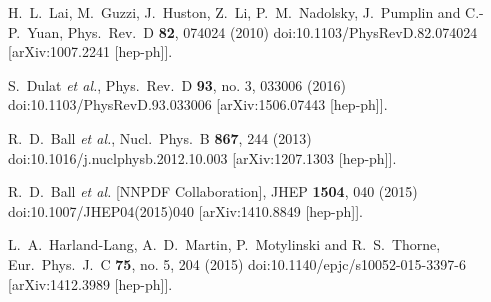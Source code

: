 \documentclass[12pt]{article}
\begin{document}
\begin{thebibliography}{99}
  H.~L.~Lai, M.~Guzzi, J.~Huston, Z.~Li, P.~M.~Nadolsky, J.~Pumplin and C.-P.~Yuan,
  Phys.\ Rev.\ D {\bf 82}, 074024 (2010)
  doi:10.1103/PhysRevD.82.074024
  [arXiv:1007.2241 [hep-ph]].

  S.~Dulat {\it et al.},
  Phys.\ Rev.\ D {\bf 93}, no. 3, 033006 (2016)
  doi:10.1103/PhysRevD.93.033006
  [arXiv:1506.07443 [hep-ph]].

  R.~D.~Ball {\it et al.},
  Nucl.\ Phys.\ B {\bf 867}, 244 (2013)
  doi:10.1016/j.nuclphysb.2012.10.003
  [arXiv:1207.1303 [hep-ph]].
  
  R.~D.~Ball {\it et al.} [NNPDF Collaboration],
  JHEP {\bf 1504}, 040 (2015)
  doi:10.1007/JHEP04(2015)040
  [arXiv:1410.8849 [hep-ph]].
    
  L.~A.~Harland-Lang, A.~D.~Martin, P.~Motylinski and R.~S.~Thorne,
  Eur.\ Phys.\ J.\ C {\bf 75}, no. 5, 204 (2015)
  doi:10.1140/epjc/s10052-015-3397-6
  [arXiv:1412.3989 [hep-ph]].

\end{thebibliography}
\end{document}
